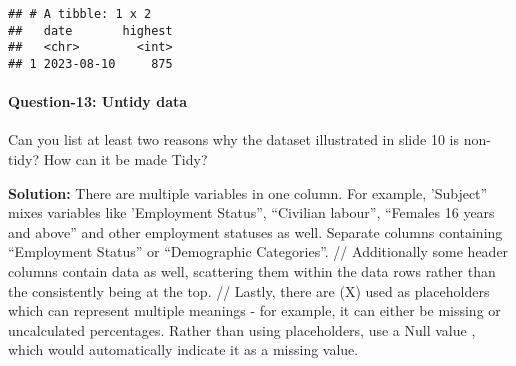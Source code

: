 \documentclass[
]{article}
\begin{document}
\begin{verbatim}
## # A tibble: 1 x 2
##   date       highest
##   <chr>        <int>
## 1 2023-08-10     875
\end{verbatim}

\hypertarget{question-13-untidy-data}{%
\paragraph{Question-13: Untidy data}\label{question-13-untidy-data}}

Can you list at least two reasons why the dataset illustrated in slide
10 is non-tidy? How can it be made Tidy?

\textbf{Solution:} There are multiple variables in one column. For
example, 'Subject'' mixes variables like 'Employment Status'',
``Civilian labour'', ``Females 16 years and above'' and other employment
statuses as well. Separate columns containing ``Employment Status'' or
``Demographic Categories''. // Additionally some header columns contain
data as well, scattering them within the data rows rather than the
consistently being at the top. // Lastly, there are (X) used as
placeholders which can represent multiple meanings - for example, it can
either be missing or uncalculated percentages. Rather than using
placeholders, use a Null value , which would automatically indicate it
as a missing value.
\end{document}
